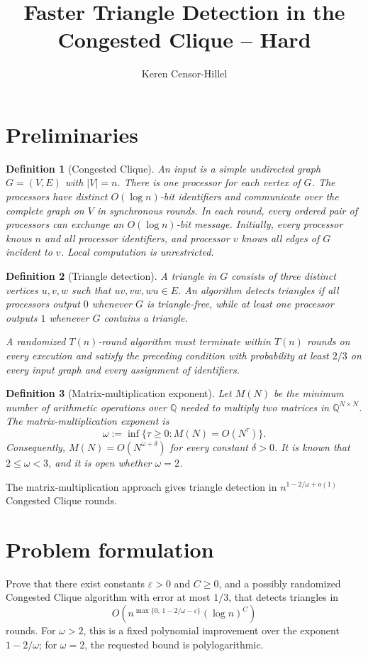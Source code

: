 \documentclass[10pt]{article}
\title{Faster Triangle Detection in the Congested Clique -- Hard}
\author{Keren Censor-Hillel}
\date{}
\newtheorem{definition}{Definition}
\begin{document}
\maketitle

\section{Preliminaries}

\begin{definition}[Congested Clique]
An input is a simple undirected graph $G=(V,E)$ with $|V|=n$. There is one
processor for each vertex of $G$. The processors have distinct
$O(\!\log n)$-bit identifiers and communicate over the complete graph on
$V$ in synchronous rounds. In each round, every ordered pair of processors
can exchange an $O(\!\log n)$-bit message. Initially, every processor
knows $n$ and all processor identifiers, and processor $v$ knows all edges of
$G$ incident to $v$. Local computation is unrestricted.
\end{definition}

\begin{definition}[Triangle detection]
A triangle in $G$ consists of three distinct vertices $u,v,w$ such that
$uv,vw,wu\in E$. An algorithm detects triangles if all processors output
$0$ whenever $G$ is triangle-free, while at least one processor outputs
$1$ whenever $G$ contains a triangle.

A randomized $T(n)$-round algorithm must terminate within $T(n)$ rounds on
every execution and satisfy the preceding condition with probability at
least $2/3$ on every input graph and every assignment of identifiers.
\end{definition}

\begin{definition}[Matrix-multiplication exponent]
Let $M(N)$ be the minimum number of arithmetic operations over $\mathbb{Q}$
needed to multiply two matrices in $\mathbb{Q}^{N\times N}$. The
\emph{matrix-multiplication exponent} is
\[
\omega:=\inf\bigl\{\tau\geq 0:M(N)=O(N^\tau)\bigr\}.
\]
Consequently, $M(N)=O(N^{\omega+\delta})$ for every constant $\delta>0$.
It is known that $2\leq\omega<3$, and it is open whether $\omega=2$.
\end{definition}

The matrix-multiplication approach gives triangle detection in
$n^{1-2/\omega+o(1)}$ Congested Clique rounds.

\section{Problem formulation}

Prove that there exist constants $\varepsilon>0$ and $C\geq 0$, and a
possibly randomized Congested Clique algorithm with error at most $1/3$,
that detects triangles in
\[
O\!\left(
 n^{\max\{0,\,1-2/\omega-\varepsilon\}}(\log n)^C
\right)
\]
rounds. For $\omega>2$, this is a fixed polynomial improvement over the
exponent $1-2/\omega$; for $\omega=2$, the requested bound is
polylogarithmic.
\end{document}
